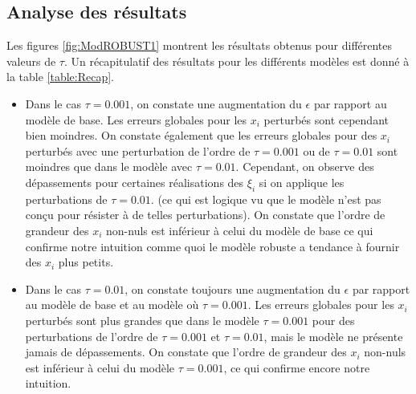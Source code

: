 \subsection{Analyse des résultats}
Les figures \ref{fig:ModROBUST1} montrent les résultats obtenus pour différentes valeurs de $\tau$. Un récapitulatif des résultats pour les différents modèles est donné à la table \ref{table:Recap}.\\
\begin{itemize}
\item Dans le cas $\tau = 0.001$, on constate une augmentation du $\epsilon$ par rapport au modèle de base. Les erreurs globales pour les $x_i$ perturbés sont cependant bien moindres. On constate également que les erreurs globales pour des $x_i$ perturbés avec une perturbation de l'ordre de $\tau=0.001$ ou de $\tau = 0.01$ sont moindres que dans le modèle avec $\tau=0.01$. Cependant, on observe des dépassements pour certaines réalisations des $\xi_i$ si on applique les perturbations de $\tau=0.01$. (ce qui est logique vu que le modèle n'est pas conçu pour résister à de telles perturbations). On constate que l'ordre de grandeur des $x_i$ non-nuls est inférieur à celui du modèle de base ce qui confirme notre intuition comme quoi le modèle robuste a tendance à fournir des $x_i$ plus petits.\\ 
 \item Dans le cas $\tau = 0.01$, on constate toujours une augmentation du $\epsilon$ par rapport au modèle de base et au modèle où $\tau = 0.001$. Les erreurs globales pour les $x_i$ perturbés sont plus grandes que dans le modèle $\tau=0.001$ pour des perturbations de l'ordre de $\tau = 0.001$ et $\tau=0.01$, mais le modèle ne présente jamais de dépassements. On constate que l'ordre de grandeur des $x_i$ non-nuls est inférieur à celui du modèle $\tau=0.001$, ce qui confirme encore notre intuition.
\end{itemize}

